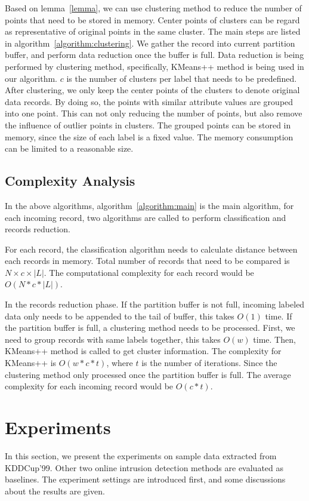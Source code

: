 \documentclass[runningheads]{llncs}
\begin{document}
	Based on lemma~\ref{lemma}, we can use clustering method to reduce the number of points that need to be stored in memory. Center points of clusters can be regard as representative of original points in the same cluster. The main steps are listed in algorithm~\ref{algorithm:clustering}. We gather the record into current partition buffer, and perform data reduction once the buffer is full. Data reduction is being performed by clustering method, specifically, KMeans++\cite{Arthur} method is being used in our algorithm. $c$ is the number of clusters per label that needs to be predefined. After clustering, we only keep the center points of the clusters to denote original data records. By doing so, the points with similar attribute values are grouped into one point. This can not only reducing the number of points, but also remove the influence of outlier points in clusters. The grouped points can be stored in memory, since the size of each label is a fixed value. The memory consumption can be limited to a reasonable size. 
	
	\subsection{Complexity Analysis}
	
	In the above algorithms, algorithm~\ref{algorithm:main} is the main algorithm, for each incoming record, two algorithms are called to perform classification and records reduction.
	
	For each record, the classification algorithm needs to calculate distance between each records in memory. Total number of records that need to be compared is $N \times c \times |L|$. The computational complexity for each record would be $O(N*c*|L|)$.
	
	In the records reduction phase. If the partition buffer is not full, incoming labeled data only needs to be appended to the tail of buffer, this takes $O(1)$ time. If the partition buffer is full, a clustering method needs to be processed. First, we need to group records with same labels together, this takes $O(w)$ time. Then, KMeans++ method is called to get cluster information. The complexity for KMeans++ is $O(w*c*t)$, where $t$ is the number of iterations. Since the clustering method only processed once the partition buffer is full. The average complexity for each incoming record would be $O(c*t)$.
	
	\section{Experiments} \label{Experiments}
	In this section, we present the experiments on sample data extracted from KDDCup'99. Other two online intrusion detection methods are evaluated as baselines. The experiment settings are introduced first, and some discussions about the results are given.
	
\end{document}
